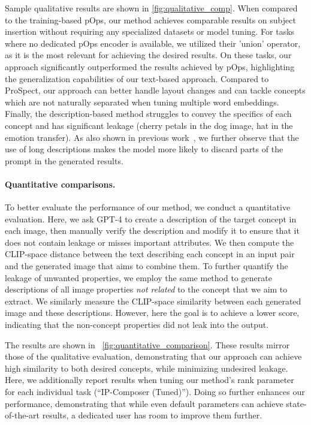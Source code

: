 Sample qualitative results are shown in \cref{fig:qualitative_comp}. When compared to the training-based pOps, our method achieves comparable results on subject insertion without requiring any specialized datasets or model tuning. For tasks where no dedicated pOps encoder is available, we utilized their 'union' operator, as it is the most relevant for achieving the desired results. On these tasks, our approach significantly outperformed the results achieved by pOps, highlighting the generalization capabilities of our text-based approach. Compared to ProSpect, our approach can better handle layout changes and can tackle concepts which are not naturally separated when tuning multiple word embeddings. Finally, the description-based method struggles to convey the specifics of each concept and has significant leakage (cherry petals in the dog image, hat in the emotion transfer). As also shown in previous work~\citep{gal2022textual}, we further observe that the use of long descriptions makes the model more likely to discard parts of the prompt in the generated results.





\paragraph{\textbf{Quantitative comparisons.}}
To better evaluate the performance of our method, we  conduct a quantitative evaluation. Here, we ask GPT-4 to create a description of the target concept in each image, then manually verify the description and modify it to ensure that it does not contain leakage or misses important attributes. We then compute the CLIP-space distance between the text describing each concept in an input pair and the generated image that aims to combine them. To further quantify the leakage of unwanted properties, we employ the same method to generate descriptions of all image properties \textit{not related} to the concept that we aim to extract. We similarly measure the CLIP-space similarity between each generated image and these descriptions. However, here the goal is to achieve a lower score, indicating that the non-concept properties did not leak into the output.

The results are shown in ~\cref{fig:quantitative_comparison}. These results mirror those of the qualitative evaluation, demonstrating that our approach can achieve high similarity to both desired concepts, while minimizing undesired leakage. Here, we additionally report results when tuning our method's rank parameter for each individual task (``IP-Composer (Tuned)''). Doing so further enhances our performance, demonstrating that while even default parameters can achieve state-of-the-art results, a dedicated user has room to improve them further.

